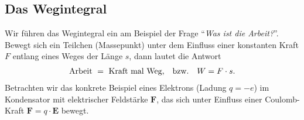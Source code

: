 \subsection{Das Wegintegral}

Wir führen das Wegintegral ein am Beispiel der Frage ``\emph{Was ist die Arbeit?}''. Bewegt sich ein Teilchen (Massepunkt) unter dem Einfluss einer konstanten Kraft $F$ entlang eines Weges der Länge $s$, dann lautet die Antwort 
\begin{align}
    \text{Arbeit } = \text{ Kraft mal Weg,} \qq{bzw.} W = F\cdot s.
\end{align}
Betrachten wir das konkrete Beispiel eines Elektrons (Ladung $q = -e$) im Kondensator mit elektrischer Feldstärke $\bm{F}$, das sich unter Einfluss einer Coulomb-Kraft $\bm{F} = q \cdot \bm{E}$ bewegt. 
\begin{figure}[htp]
    \centering
\end{figure}

